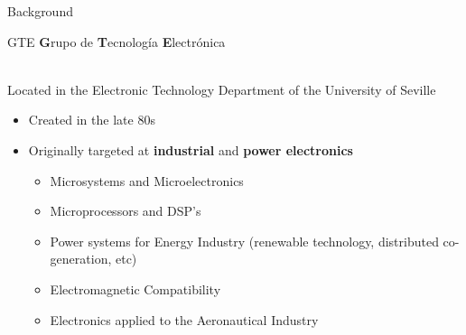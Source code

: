 \begin{frame}{Background}
	\begin{minipage}[t]{\textwidth}
		\begin{block}{\centering \footnotesize GTE}
			\centering	
			\textbf{G}rupo de \textbf{T}ecnolog\'ia \textbf{E}lectr\'onica
		\end{block}
	\end{minipage}
	\\ \vspace{15pt}
	Located in the Electronic Technology Department of the University of Seville
	\begin{itemize}
		\item 	Created in the late 80s
		\item 	Originally targeted at \textbf{industrial} and \textbf{power electronics}
		\vspace{2pt}			
	 	\begin{itemize}
	 		\scriptsize
		 	\item Microsystems and Microelectronics
			\vspace{2pt}
			\item Microprocessors and DSP's
			\vspace{2pt}
			\item Power systems for Energy Industry (renewable technology, distributed co-generation, etc)
			\vspace{2pt}
			\item Electromagnetic Compatibility
			\vspace{2pt}
			\item Electronics applied to the Aeronautical Industry
			
		\end{itemize}
	\end{itemize}		
\end{frame}